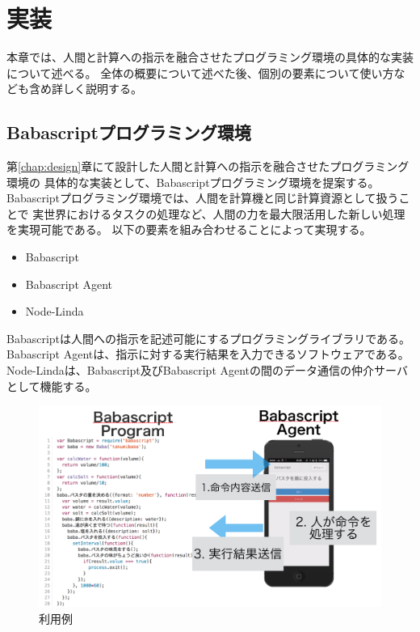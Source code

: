 \chapter{実装}\label{chap:implementation}

本章では、人間と計算への指示を融合させたプログラミング環境の具体的な実装について述べる。
全体の概要について述べた後、個別の要素について使い方なども含め詳しく説明する。

\newpage

\section{Babascriptプログラミング環境}\label{babascriptux30d7ux30edux30b0ux30e9ux30dfux30f3ux30b0ux74b0ux5883}

第\ref{chap:design}章にて設計した人間と計算への指示を融合させたプログラミング環境の
具体的な実装として、Babascriptプログラミング環境を提案する。
Babascriptプログラミング環境では、人間を計算機と同じ計算資源として扱うことで
実世界におけるタスクの処理など、人間の力を最大限活用した新しい処理を実現可能である。
以下の要素を組み合わせることによって実現する。

\begin{itemize}
\itemsep1pt\parskip0pt
\item
  Babascript
\item
  Babascript Agent
\item
  Node-Linda
\end{itemize}

Babascriptは人間への指示を記述可能にするプログラミングライブラリである。
Babascript Agentは、指示に対する実行結果を入力できるソフトウェアである。
Node-Lindaは、Babascript及びBabascript
Agentの間のデータ通信の仲介サーバとして機能する。

\begin{figure}[htbp]
  \begin{center}
  \includegraphics[width=.7\linewidth,bb=0 0 1007 592]{images/overview-using.png}
  \end{center}
  \caption{利用例}
  \label{fig:overview_using}
\end{figure}

